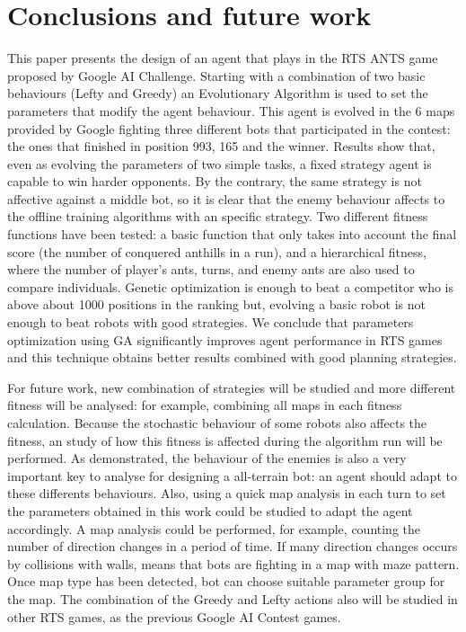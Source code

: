 \documentclass[runningheads]{llncs}
\begin{document}

\section{Conclusions and future work}

This paper presents the design of an agent that plays in the RTS ANTS game proposed by Google AI Challenge. Starting with a combination of two basic behaviours (Lefty and Greedy) an Evolutionary Algorithm is used to set the parameters that modify the agent behaviour. This agent is evolved in the 6 maps provided by Google fighting three different bots that participated in the contest: the ones that finished in position 993, 165 and the winner. Results show that, even as evolving the parameters of two simple tasks, a fixed strategy agent is capable to win harder opponents. By the contrary, the same strategy is not affective against a middle bot, so it is clear that the enemy behaviour affects to the offline training algorithms with an specific strategy. Two different fitness functions have been tested: a basic function that only takes into account the final score (the number of conquered anthills in a run), and a hierarchical fitness, where the number of player's ants, turns, and enemy ants are also used to compare individuals. Genetic optimization is enough to beat a competitor who is above about 1000 positions in the ranking but, evolving a basic robot is not enough to beat robots with good strategies. We conclude that parameters optimization using GA significantly improves agent performance in RTS games and this technique obtains better results combined with good planning strategies.

For future work, new combination of strategies will be studied and more different fitness will be analysed: for example, combining all maps in each fitness calculation. Because the stochastic behaviour of some robots also affects the fitness, an study of how this fitness is affected during the algorithm run will be performed. As demonstrated, the behaviour of the enemies is also a very important key to analyse for designing a all-terrain bot: an agent should adapt to these differents behaviours. Also, using a quick map analysis in each turn to set the parameters obtained in this work could be studied to adapt the agent accordingly. A map analysis could be performed, for example, counting the number of
direction changes in a period of time. If many direction changes occurs by collisions with walls, means that bots are fighting in a map with maze pattern. Once map type has been detected, bot can choose suitable parameter group for the map. The combination of the Greedy and Lefty actions also will be studied in other RTS games, as the previous Google AI Contest games.



\end{document}
